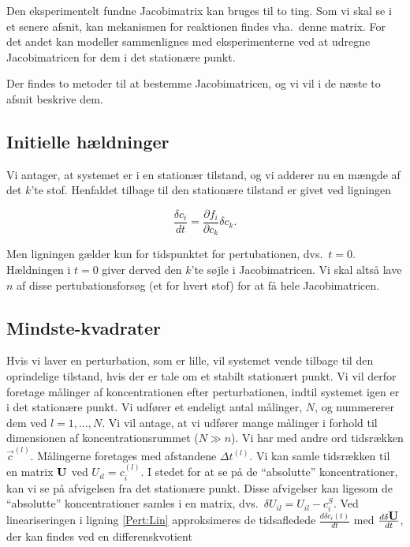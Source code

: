 \vspace{4.0mm}
Den eksperimentelt fundne Jacobimatrix kan bruges til to
ting. Som vi skal se i et senere afsnit, kan mekanismen for
reaktionen findes vha.\ denne matrix. For det andet kan
modeller sammenlignes med eksperimenterne ved at udregne
Jacobimatricen for dem i det station{\ae}re punkt.

\vspace{4.0mm}
Der findes to metoder til at bestemme Jacobimatricen, og vi
vil i de n{\ae}ste to afsnit beskrive dem.

\subsection{Initielle h{\ae}ldninger}
Vi antager, at systemet er i en station{\ae}r tilstand, og
vi adderer nu en m{\ae}ngde af det $k$'te stof. Henfaldet
tilbage til den station{\ae}re tilstand er givet ved
ligningen

\begin{equation}
  \frac{\delta c_i}{dt} = \frac{\partial f_i}{\partial c_k}\delta c_k.
\end{equation}

Men ligningen g{\ae}lder kun for tidspunktet for
pertubationen, dvs.\ $t=0$. H{\ae}ldningen i $t=0$ giver
derved den $k$'te s{\o}jle i Jacobimatricen. Vi skal
alts{\aa} lave $n$ af disse pertubationsfors{\o}g (et for
hvert stof) for at f{\aa} hele Jacobimatricen.

\subsection{Mindste-kvadrater}
Hvis vi laver en perturbation, som er lille, vil systemet
vende tilbage til den oprindelige tilstand, hvis der er
tale om et stabilt station{\ae}rt punkt. Vi vil derfor
foretage m{\aa}linger af koncentrationen efter
perturbationen, indtil systemet igen er i det
station{\ae}re punkt. Vi udf{\o}rer et endeligt antal
m{\aa}linger, $N$, og nummererer dem ved $l = 1, \ldots,
N$. Vi vil antage, at vi udf{\o}rer mange m{\aa}linger i
forhold til dimensionen af koncentrationsrummet ($N \gg
n$). Vi har med andre ord tidsr{\ae}kken $\vec{c}^{(l)}$.
M{\aa}lingerne foretages med afstandene $\Delta t^{(l)}$.
Vi kan samle tidsr{\ae}kken til en matrix $\mbox{${\bf U}$}$ ved
$U_{il} = c_i^{(l)}$. I stedet for at se p{\aa} de
``absolutte'' koncentrationer, kan vi se p{\aa} afvigelsen
fra det station{\ae}re punkt. Disse afvigelser kan ligesom
de ``absolutte'' koncentrationer samles i en matrix, dvs.\
$\delta U_{il} = U_{il} - c_i^S$. Ved lineariseringen i
ligning \ref{Pert:Lin} approksimeres de tidsafledede
$\frac{d\delta c_i(t)}{dt}$ med $\frac{d\delta
\mbox{${\bf U}$}}{dt}$, der kan findes ved en differenskvotient

